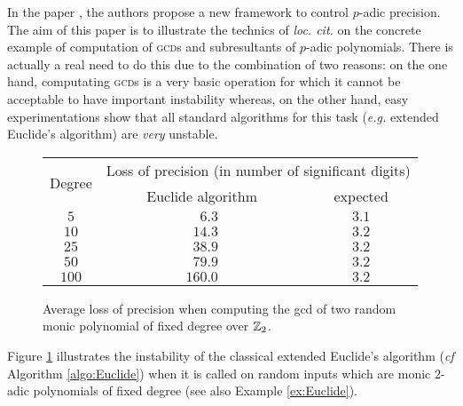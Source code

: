 \documentclass{article}
\begin{document}
In the paper \cite{padicprec}, the authors propose a new framework to 
control $p$-adic precision. The aim of this paper is to illustrate the 
technics of \emph{loc. cit.} on the concrete example of computation of 
\textsc{gcd}s and subresultants of $p$-adic polynomials. There is 
actually a real need to do this due to the combination of two reasons: 
on the one hand, computating \textsc{gcd}s is a very basic operation for 
which it cannot be acceptable to have important instability whereas, on 
the other hand, easy experimentations show that all standard algorithms 
for this task (\emph{e.g.} extended Euclide's algorithm) are \emph{very} 
unstable.
%
\begin{figure}
\renewcommand{\arraystretch}{1.2}
\begin{center}
\begin{tabular}{|c||c|c|}
\hline
\multirow{2}{*}{\hspace{0.2cm}Degree\hspace{0.2cm}\null} & 
\multicolumn{2}{c|}{\hspace{0.1cm}Loss of precision (in number of significant digits)\hspace{0.1cm}\null}\\
\cline{2-3}
& \hspace{0.5cm}Euclide algorithm\hspace{0.5cm}\null & expected \\
\hline
$5$ & $\phantom{00}6.3$ & $3.1$ \\
$10$ & $\phantom{0}14.3$ & $3.2$ \\
$25$ & $\phantom{0}38.9$ & $3.2$ \\
$50$ & $\phantom{0}79.9$ & $3.2$ \\
$100$ & $160.0$ & $3.2$ \\
\hline
\end{tabular}
\end{center}

\vspace{-0.3cm}

\caption{Average loss of precision when computing the {\sc gcd}
of two random monic polynomial of fixed degree over $\mathbb Z_2$.}
\label{fig:precision}

\vspace{-0.3cm}
\end{figure}
%
Figure \ref{fig:precision} illustrates the instability of the classical
extended Euclide's algorithm (\emph{cf} Algorithm \ref{algo:Euclide})
when it is called on random inputs which are monic $2$-adic 
polynomials of fixed degree (see also Example \ref{ex:Euclide}). 
\end{document}
